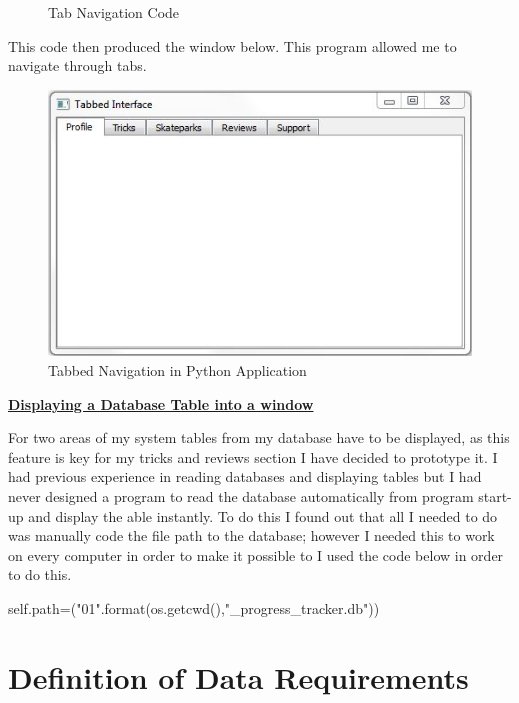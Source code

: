 \begin{figure}[H]
    \caption{Tab Navigation Code} \label{fig:Tab Code}
\end{figure}

This code then produced the window below. This program allowed me to navigate through tabs.

\begin{figure}[H]
    \includegraphics[width=\textwidth]{./Design/Prototype/TabbedInterface.JPG}
    \caption{Tabbed Navigation in Python Application} \label{fig:Tabs}
\end{figure}

\textbf{\underline{Displaying a Database Table into a window}}

For two areas of my system tables from my database have to be displayed, as this feature is key for my tricks and reviews section I have decided to prototype it. I had previous experience in reading databases and displaying tables but I had never designed a program to read the database automatically from program start-up and display the able instantly. To do this I found out that all I needed to do was manually code the file path to the database; however I needed this to work on every computer in order to make it possible to I used the code below in order to do this.

\begin{python}
self.path=("{0}{1}".format(os.getcwd(),"\skateboard_progress_tracker.db"))
\end{python}



\section{Definition of Data Requirements}

